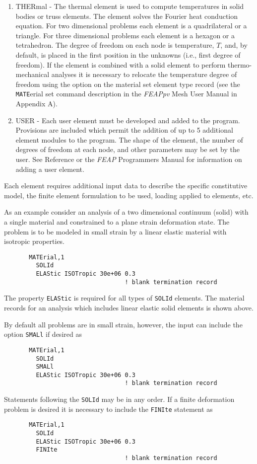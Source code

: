 \begin{enumerate}
\item
THERmal -  The thermal element is used to compute temperatures in solid
bodies or truss elements.  The element solves the Fourier heat conduction
equation.
For two dimensional problems each element is a quadrilateral
or a triangle.
For three dimensional problems each element
is a hexagon or a tetrahedron.
The degree of freedom on each node is temperature, $T$, and, by default,
is placed in the first position in the unknowns (i.e., first degree of freedom).
If the element is combined with a solid element to perform thermo-mechanical
analyses it is necessary to relocate the temperature degree of freedom using
the option on the material set element type record (see the \texttt{MATE}erial
set command description in the {\sl FEAPpv} Mesh User Manual in Appendix A).

\item
USER -  Each user element must be developed and added to the program.
Provisions are included which permit the addition of up to 5 additional
element modules to the program.
The shape of the element, the number of degrees of freedom at each node,
and other parameters may be set by the user.  See Reference \cite{zt1n}
or the {\sl FEAP} Programmers Manual for information on adding
a user element.
\end{enumerate}

Each element requires additional input data to describe the
specific constitutive model, the finite element formulation to be used,
loading applied to elements, etc.

As an example consider an analysis of a two dimensional
continuum (solid) with a single material and constrained to a plane strain
deformation state.  The problem is to be modeled in small strain
by a linear elastic material with isotropic properties.
\begin{verbatim}
       MATErial,1
         SOLId
         ELAStic ISOTropic 30e+06 0.3
                                  ! blank termination record
\end{verbatim}
The property \texttt{ELAStic} is required for all types of \texttt{SOLId}
elements.  The material records for an
analysis which includes linear elastic solid elements is shown above.

By default all problems are in small strain, however, the input can include
the option \texttt{SMALl} if desired as
\begin{verbatim}
       MATErial,1
         SOLId
         SMALl
         ELAStic ISOTropic 30e+06 0.3
                                  ! blank termination record
\end{verbatim}
Statements following the \texttt{SOLId} may be in any order.  If a finite
deformation problem is desired it is necessary to include the \texttt{FINIte}
statement as 
\begin{verbatim}
       MATErial,1
         SOLId
         ELAStic ISOTropic 30e+06 0.3
         FINIte
                                  ! blank termination record
\end{verbatim}

